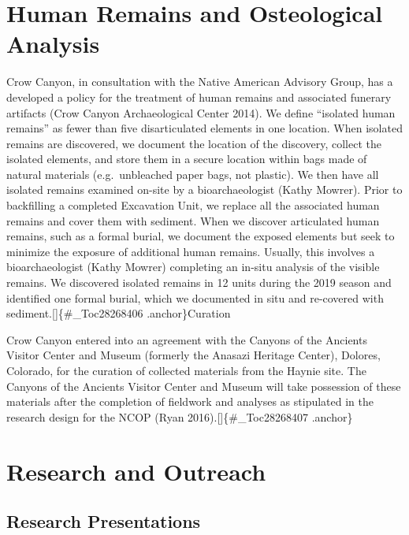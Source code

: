 \documentclass[
  12pt,
]{krantz}
\begin{document}
\hypertarget{human-remains-and-osteological-analysis}{%
\chapter{Human Remains and Osteological Analysis}\label{human-remains-and-osteological-analysis}}

Crow Canyon, in consultation with the Native American Advisory Group,
has a developed a policy for the treatment of human remains and
associated funerary artifacts (Crow Canyon Archaeological Center 2014).
We define ``isolated human remains'' as fewer than five disarticulated
elements in one location. When isolated remains are discovered, we
document the location of the discovery, collect the isolated elements,
and store them in a secure location within bags made of natural
materials (e.g.~unbleached paper bags, not plastic). We then have all
isolated remains examined on-site by a bioarchaeologist (Kathy Mowrer).
Prior to backfilling a completed Excavation Unit, we replace all the
associated human remains and cover them with sediment. When we discover
articulated human remains, such as a formal burial, we document the
exposed elements but seek to minimize the exposure of additional human
remains. Usually, this involves a bioarchaeologist (Kathy Mowrer)
completing an in-situ analysis of the visible remains. We discovered
isolated remains in 12 units during the 2019 season and identified one
formal burial, which we documented in situ and re-covered with
sediment.{[}{]}\{\#\_Toc28268406 .anchor\}Curation

Crow Canyon entered into an agreement with the Canyons of the Ancients
Visitor Center and Museum (formerly the Anasazi Heritage Center),
Dolores, Colorado, for the curation of collected materials from the
Haynie site. The Canyons of the Ancients Visitor Center and Museum will
take possession of these materials after the completion of fieldwork and
analyses as stipulated in the research design for the NCOP (Ryan
2016).{[}{]}\{\#\_Toc28268407 .anchor\}

\hypertarget{research-and-outreach}{%
\chapter{Research and Outreach}\label{research-and-outreach}}

\hypertarget{research-presentations}{%
\section{Research Presentations}\label{research-presentations}}
\end{document}
